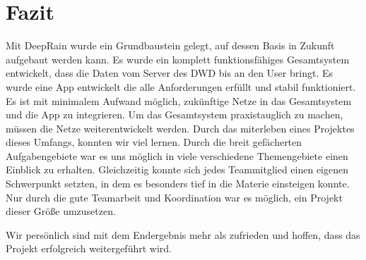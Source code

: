 \section{Fazit}
Mit DeepRain wurde ein Grundbaustein gelegt, auf dessen Basis in Zukunft aufgebaut werden kann. 
Es wurde ein komplett funktionsfähiges Gesamtsystem entwickelt, dass die Daten vom Server des DWD bis an den User bringt.
Es wurde eine App entwickelt die alle Anforderungen erfüllt und stabil funktioniert. 
Es ist mit minimalem Aufwand möglich, zukünftige Netze in das Gesamtsystem und die App zu integrieren. 
Um das Gesamtsystem praxistauglich zu machen, müssen die Netze weiterentwickelt werden. 
Durch das miterleben eines Projektes dieses Umfangs, konnten wir viel lernen. 
Durch die breit gefächerten Aufgabengebiete war es uns möglich in viele verschiedene Themengebiete einen Einblick zu erhalten. 
Gleichzeitig konnte sich jedes Teammitglied einen eigenen Schwerpunkt setzten, in dem es besonders tief in die Materie einsteigen konnte. 
Nur durch die gute Teamarbeit und Koordination war es möglich, ein Projekt dieser Größe umzusetzen. 


\noindent Wir persönlich sind mit dem Endergebnis mehr als zufrieden und hoffen, dass das Projekt erfolgreich weitergeführt wird.

